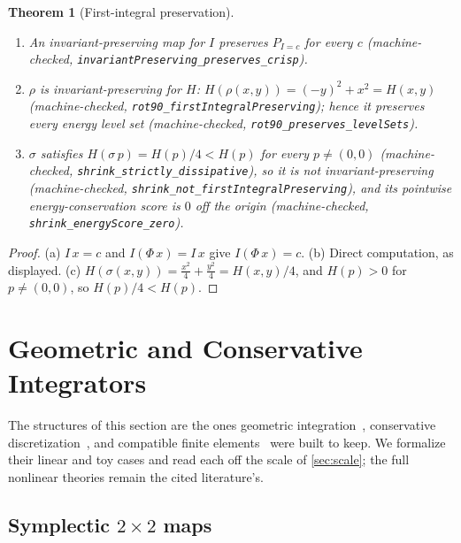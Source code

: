 \documentclass[11pt,a4paper]{article}
\newtheorem{theorem}{Theorem}[section]
\begin{document}
\begin{theorem}[First-integral preservation]
\label{thm:firstintegral}
\begin{enumerate}[label=\textup{(\alph*)},nosep]
\item An invariant-preserving map for $I$ preserves $P_{I=c}$ for every
  $c$
  (machine-checked, \texttt{invariantPreserving\_preserves\_crisp}).
\item $\rho$ is invariant-preserving for $H$:
  $H(\rho(x,y)) = (-y)^2 + x^2 = H(x,y)$
  (machine-checked, \texttt{rot90\_firstIntegralPreserving}); hence it
  preserves every energy level set
  (machine-checked, \texttt{rot90\_preserves\_levelSets}).
\item $\sigma$ satisfies $H(\sigma\,p) = H(p)/4 < H(p)$ for every
  $p \neq (0,0)$
  (machine-checked, \texttt{shrink\_strictly\_dissipative}), so it is
  not invariant-preserving
  (machine-checked, \texttt{shrink\_not\_firstIntegralPreserving}),
  and its pointwise energy-conservation score is $0$ off the origin
  (machine-checked, \texttt{shrink\_energyScore\_zero}).
\end{enumerate}
\end{theorem}
\begin{proof}
(a) $I\,x = c$ and $I(\Phi\,x) = I\,x$ give $I(\Phi\,x) = c$.
(b) Direct computation, as displayed.
(c) $H(\sigma(x,y)) = \tfrac{x^2}{4} + \tfrac{y^2}{4} = H(x,y)/4$, and
$H(p) > 0$ for $p \neq (0,0)$, so $H(p)/4 < H(p)$.
\end{proof}

\section{Geometric and Conservative Integrators}
\label{sec:geometric}

The structures of this section are the ones geometric
integration~\cite{hairer2006}, conservative
discretization~\cite{leveque2002}, and compatible finite
elements~\cite{arnold2006} were built to keep.
We formalize their linear and toy cases and read each off the scale of
\cref{sec:scale}; the full nonlinear theories remain the cited
literature's.

\subsection{Symplectic $2 \times 2$ maps}
\end{document}
